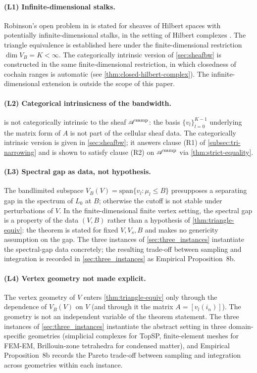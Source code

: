 \paragraph{(L1) Infinite-dimensional stalks.}
Robinson's open problem in \cite[\S 6]{Robinson2014} is stated for
sheaves of Hilbert spaces with potentially infinite-dimensional
stalks, in the setting of Hilbert complexes \cite{BruningLesch1992}.
The triangle equivalence is established here under the
finite-dimensional restriction $\dim V_B = K < \infty$. The
categorically intrinsic version of \cref{sec:sheafbw} is constructed
in the same finite-dimensional restriction, in which closedness of
cochain ranges is automatic
(see \cref{thm:closed-hilbert-complex}). The infinite-dimensional
extension is outside the scope of this paper.

\paragraph{(L2) Categorical intrinsicness of the bandwidth.}
 is not categorically intrinsic to the
sheaf $\mathscr{A}^{\mathrm{samp}}$: the basis $\{v_l\}_{l=0}^{K-1}$ underlying the
matrix form of $A$ is not part of the cellular sheaf data. The
categorically intrinsic version is given in \cref{sec:sheafbw}; it
answers clause \textup{(R1)} of \cref{subsec:tri-narrowing} and is
shown to satisfy clause \textup{(R2)} on $\mathscr{A}^{\mathrm{samp}}$ via
\cref{thm:strict-equality}.

\paragraph{(L3) Spectral gap as data, not hypothesis.}
The bandlimited subspace
$V_B(V) = \mathrm{span}\{v_l : \mu_l \le B\}$ presupposes a separating
gap in the spectrum of $L_0$ at $B$; otherwise the cutoff is not
stable under perturbations of $V$. In the finite-dimensional finite
vertex setting, the spectral gap is a property of the data $(V, B)$
rather than a hypothesis of \cref{thm:triangle-equiv}: the theorem
is stated for fixed $V, V_s, B$ and makes no genericity assumption
on the gap. The three instances of \cref{sec:three_instances}
instantiate the spectral-gap data concretely; the resulting
trade-off between sampling and integration is recorded in
\cref{sec:three_instances} as Empirical Proposition~8b.

\paragraph{(L4) Vertex geometry not made explicit.}
The vertex geometry of $V$ enters \cref{thm:triangle-equiv} only
through the dependence of $V_B(V)$ on $V$ (and through it the matrix
$A = [v_l(i_n)]$). The geometry is not an independent variable of
the theorem statement. The three instances of
\cref{sec:three_instances} instantiate the abstract setting in three
domain-specific geometries (simplicial complexes for TopSP,
finite-element meshes for FEM-EM, Brillouin-zone tetrahedra for
condensed matter), and Empirical Proposition~8b records the Pareto
trade-off between sampling and integration across geometries within
each instance.

